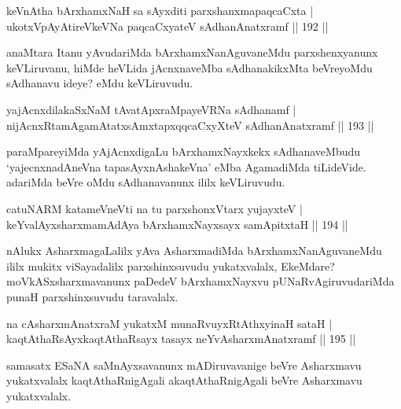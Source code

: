 
\begin{shl}
keVnAtha bArxhamxNaH sa sAyxditi parxshanxmapaqcaCxta |\\
ukotxVpAyAtireVkeVNa paqcaCxyateV sAdhanAnatxramf \hfill || 192 ||
\end{shl}

\begin{artha}
anaMtara Itanu yAvudariMda bArxhamxNanAguvaneMdu parxshenxyanunx keVLiruvanu, hiMde heVLida jAcnxnaveMba sAdhanakikxMta beVreyoMdu sAdhanavu ideye? eMdu keVLiruvudu.
\end{artha}


\begin{shl}
yajAcnxdilakaSxNaM tAvatApxraMpayeVRNa sAdhanamf |\\
nijAcnxRtamAgamAtatxsAmxtapxqqcaCxyXteV sAdhanAnatxramf \hfill || 193 ||
\end{shl}

\begin{artha}
paraMpareyiMda yAjAcnxdigaLu bArxhamxNayxkekx sAdhanaveMbudu `yajecnxnadAneVna tapasAyxnAshakeVna' eMba AgamadiMda tiLideVide. adariMda beVre oMdu sAdhanavanunx ililx keVLiruvudu.
\end{artha}

\begin{shl}
catuNARM katameVneVti na tu parxshonxV\s tarx yujayxteV |\\
keYvalAyxsharxmamAdAya bArxhamxNayxsayx samApitxtaH \hfill || 194 ||
\end{shl}

\begin{artha}
nAlukx AsharxmagaLalilx yAva AsharxmadiMda bArxhamxNanAguvaneMdu ililx mukitx viSayadalilx parxshinxsuvudu yukatxvalalx, EkeMdare? moVkASxsharxmavanunx paDedeV bArxhamxNayxvu pUNaRvAgiruvudariMda punaH parxshinxsuvudu taravalalx.
\end{artha}

\begin{shl}
na cA\s \s sharxmAnatxraM yukatxM munaRvuyxRtAthxyinaH sataH |\\
kaqtAthaRsAyxkaqtAthaRsayx tasayx neYvA\s \s sharxmAnatxramf \hfill || 195 ||
\end{shl}

\begin{artha}%
samasatx ESaNA saMnAyxsavanunx mADiruvavanige beVre Asharxmavu yukatxvalalx kaqtAthaRnigAgali akaqtAthaRnigAgali beVre Asharxmavu yukatxvalalx.
\end{artha}

